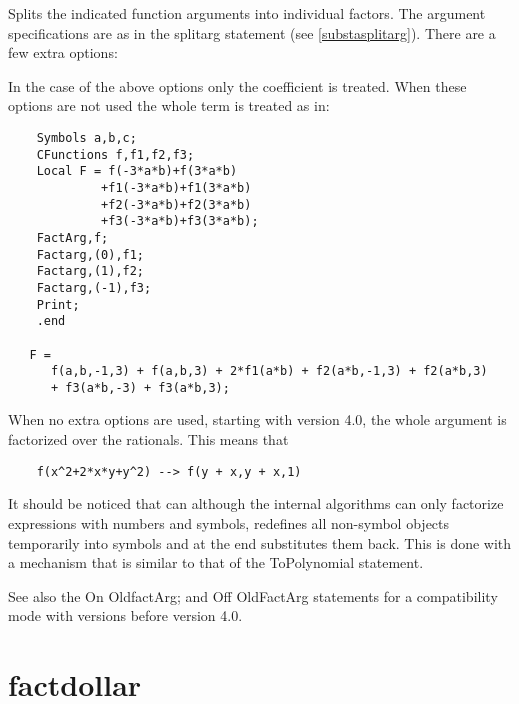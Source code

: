 \noindent Splits the indicated function arguments into individual factors. The argument specifications 
are as in the splitarg statement (see 
\ref{substasplitarg}). There are a few extra options:




\noindent In the case of the above options only the coefficient is treated. 
When these options are not used the whole term is treated as in:
\begin{verbatim}
    Symbols a,b,c;
    CFunctions f,f1,f2,f3;
    Local F = f(-3*a*b)+f(3*a*b)
             +f1(-3*a*b)+f1(3*a*b)
             +f2(-3*a*b)+f2(3*a*b)
             +f3(-3*a*b)+f3(3*a*b);
    FactArg,f;
    Factarg,(0),f1;
    Factarg,(1),f2;
    Factarg,(-1),f3;
    Print;
    .end

   F =
      f(a,b,-1,3) + f(a,b,3) + 2*f1(a*b) + f2(a*b,-1,3) + f2(a*b,3)
      + f3(a*b,-3) + f3(a*b,3);
\end{verbatim}
When no extra options are used, starting with version 4.0, the whole 
argument is factorized over the rationals. This means that
\begin{verbatim}
    f(x^2+2*x*y+y^2) --> f(y + x,y + x,1)
\end{verbatim}
It should be noticed that \FORM{} can although the internal algorithms can
only factorize expressions with numbers and symbols, \FORM{} redefines all
non-symbol objects temporarily into symbols and at the end substitutes them 
back. This is done with a mechanism that is similar to that of the 
ToPolynomial statement.

See also the On OldfactArg; and Off OldFactArg statements for a 
compatibility mode with versions before version 4.0.
\vspace{10mm}


\section{factdollar}
\label{substafactdollar}

